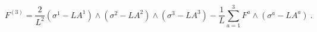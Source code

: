 \begin{equation}
\label{F3}
  F^{(3)} = \frac2{L^2} (\sigma^1-L A^1) \wedge
  (\sigma^2-L A^2) \wedge (\sigma^3-L A^3) 
  - \frac1{L} \sum\limits_{a=1}^3 F^a \wedge  
  (\sigma^a-L A^a)~.
\end{equation}

